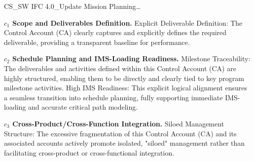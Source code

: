 %
\begin{frame}{CS\_SW IFC 4.0\_Update Mission Planning\ldots{}}
\begin{minipage}{0.90\textwidth}
\raggedright
\fontsize{8}{9.5}\selectfont
\textbf{\(c_1\) Scope and Deliverables Definition.}
Explicit Deliverable Definition: The Control Account (CA) clearly captures and explicitly defines the required deliverable, providing a transparent baseline for performance.\par\vspace{0.6em}
\textbf{\(c_2\) Schedule Planning and IMS-Loading Readiness.}
Milestone Traceability: The deliverables and activities defined within this Control Account (CA) are highly structured, enabling them to be directly and clearly tied to key program milestone activities. High IMS Readiness: This explicit logical alignment ensures a seamless transition into schedule planning, fully supporting immediate IMS-loading and accurate critical path modeling.\par\vspace{0.6em}
\textbf{\(c_3\) Cross-Product/Cross-Function Integration.}
Siloed Management Structure: The excessive fragmentation of this Control Account (CA) and its associated accounts actively promote isolated, "siloed" management rather than facilitating cross-product or cross-functional integration.\par\vspace{0.6em}
\end{minipage}
\end{frame}

\endinput
